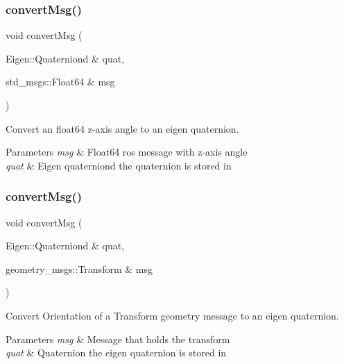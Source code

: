\subsubsection{\texorpdfstring{convert\+Msg()}{convertMsg()}\hspace{0.1cm}{\footnotesize\ttfamily [1/14]}}
{\footnotesize\ttfamily void convert\+Msg (\begin{DoxyParamCaption}\item[{Eigen\+::\+Quaterniond \&}]{quat,  }\item[{std\+\_\+msgs\+::\+Float64 \&}]{msg }\end{DoxyParamCaption})\hspace{0.3cm}{\ttfamily [inline]}}



Convert an float64 z-\/axis angle to an eigen quaternion. 


\begin{DoxyParams}{Parameters}
{\em msg} & Float64 ros message with z-\/axis angle \\
\hline
{\em quat} & Eigen quaterniond the quaternion is stored in \\
\hline
\end{DoxyParams}
\mbox{\label{group__MultiRobotController_gad42169e0be94216cd31a8a360a848155}} 
\subsubsection{\texorpdfstring{convert\+Msg()}{convertMsg()}\hspace{0.1cm}{\footnotesize\ttfamily [2/14]}}
{\footnotesize\ttfamily void convert\+Msg (\begin{DoxyParamCaption}\item[{Eigen\+::\+Quaterniond \&}]{quat,  }\item[{geometry\+\_\+msgs\+::\+Transform \&}]{msg }\end{DoxyParamCaption})\hspace{0.3cm}{\ttfamily [inline]}}



Convert Orientation of a Transform geometry message to an eigen quaternion. 


\begin{DoxyParams}{Parameters}
{\em msg} & Message that holds the transform \\
\hline
{\em quat} & Quaternion the eigen quaternion is stored in \\
\hline
\end{DoxyParams}
\mbox{\label{group__MultiRobotController_ga34987bf2293cc8aa5fac7ac60e6510ef}} 
